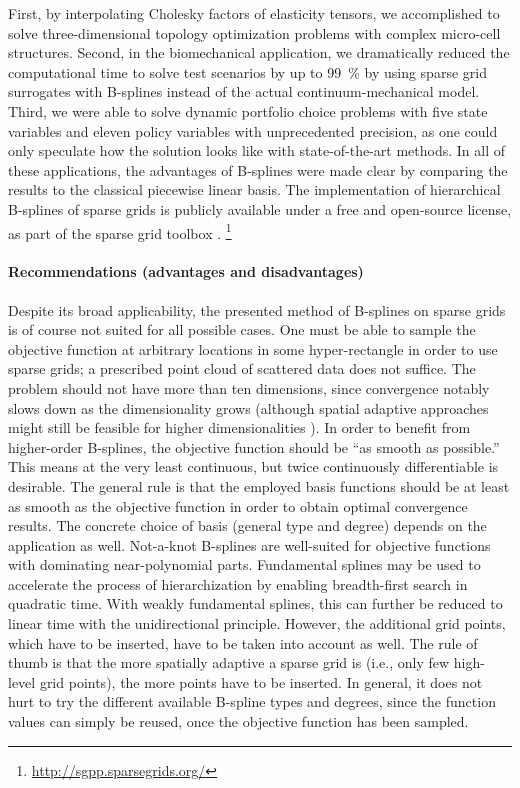 First, by interpolating Cholesky factors of elasticity tensors,
we accomplished to solve three-dimensional topology optimization problems
with complex micro-cell structures.
Second, in the biomechanical application,
we dramatically reduced the computational time to solve
test scenarios by up to \SI{99}{\percent} by using
sparse grid surrogates with B-splines instead of the
actual continuum-mechanical model.
Third, we were able to solve dynamic portfolio choice problems
with five state variables and eleven policy variables
with unprecedented precision, as one could only speculate
how the solution looks like with state-of-the-art methods.
In all of these applications, the advantages of B-splines were made clear
by comparing the results to the classical piecewise linear basis.
The implementation of hierarchical B-splines of sparse grids is
publicly available under a free and open-source license,
as part of the sparse grid toolbox \sgpp.%
\footnote{%
  \url{http://sgpp.sparsegrids.org/}%
}

\paragraph{Recommendations (advantages and disadvantages)}

Despite its broad applicability,
the presented method of B-splines on sparse grids is of course
not suited for all possible cases.
One must be able to sample the objective function at arbitrary
locations in some hyper-rectangle in order to use sparse grids;
a prescribed point cloud of scattered data does not suffice.
The problem should not have more than ten dimensions,
since convergence notably slows down as the dimensionality grows
(although spatial adaptive approaches might still be feasible for
higher dimensionalities \cite{Pflueger10Spatially}).
In order to benefit from higher-order B-splines,
the objective function should be ``as smooth as possible.''
This means at the very least continuous,
but twice continuously differentiable is desirable.
The general rule is that the employed basis functions should be
at least as smooth as the objective function in order to obtain
optimal convergence results.
The concrete choice of basis (general type and degree) depends
on the application as well.
Not-a-knot B-splines are well-suited for objective functions with
dominating near-polynomial parts.
Fundamental splines may be used to accelerate the process of
hierarchization by enabling breadth-first search in quadratic time.
With weakly fundamental splines, this can further be reduced to
linear time with the unidirectional principle.
However, the additional grid points, which have to be inserted,
have to be taken into account as well.
The rule of thumb is that the more spatially adaptive a sparse grid is
(i.e., only few high-level grid points),
the more points have to be inserted.
In general, it does not hurt to try the different available
B-spline types and degrees,
since the function values can simply be reused,
once the objective function has been sampled.

